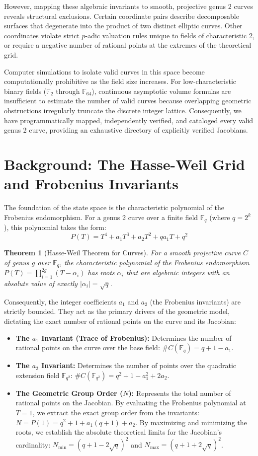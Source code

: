 \documentclass[letterpaper, 11pt]{article}
\newtheorem{theorem}{Theorem}[section]
\begin{document}
However, mapping these algebraic invariants to smooth, projective genus 2 curves reveals structural exclusions. Certain coordinate pairs describe decomposable surfaces that degenerate into the product of two distinct elliptic curves. Other coordinates violate strict $p$-adic valuation rules unique to fields of characteristic 2, or require a negative number of rational points at the extremes of the theoretical grid.

Computer simulations to isolate valid curves in this space become computationally prohibitive as the field size increases. For low-characteristic binary fields ($\mathbb{F}_2$ through $\mathbb{F}_{64}$), continuous asymptotic volume formulas are insufficient to estimate the number of valid curves because overlapping geometric obstructions irregularly truncate the discrete integer lattice. Consequently, we have programmatically mapped, independently verified, and cataloged every valid genus 2 curve, providing an exhaustive directory of explicitly verified Jacobians.

\section{Background: The Hasse-Weil Grid and Frobenius Invariants}
The foundation of the state space is the characteristic polynomial of the Frobenius endomorphism. For a genus 2 curve over a finite field $\mathbb{F}_q$ (where $q = 2^k$), this polynomial takes the form:
\[ P(T) = T^4 + a_1 T^3 + a_2 T^2 + q a_1 T + q^2 \]

\begin{theorem}[Hasse-Weil Theorem for Curves]
For a smooth projective curve $C$ of genus $g$ over $\mathbb{F}_q$, the characteristic polynomial of the Frobenius endomorphism $P(T) = \prod_{i=1}^{2g} (T - \alpha_i)$ has roots $\alpha_i$ that are algebraic integers with an absolute value of exactly $|\alpha_i| = \sqrt{q}$.
\end{theorem}

Consequently, the integer coefficients $a_1$ and $a_2$ (the Frobenius invariants) are strictly bounded. They act as the primary drivers of the geometric model, dictating the exact number of rational points on the curve and its Jacobian:
\begin{itemize}
    \item \textbf{The $a_1$ Invariant (Trace of Frobenius):} Determines the number of rational points on the curve over the base field: $\#C(\mathbb{F}_q) = q + 1 - a_1$.
    \item \textbf{The $a_2$ Invariant:} Determines the number of points over the quadratic extension field $\mathbb{F}_{q^2}$: $\#C(\mathbb{F}_{q^2}) = q^2 + 1 - a_1^2 + 2a_2$.
    \item \textbf{The Geometric Group Order ($N$):} Represents the total number of rational points on the Jacobian. By evaluating the Frobenius polynomial at $T=1$, we extract the exact group order from the invariants: $N = P(1) = q^2 + 1 + a_1(q + 1) + a_2$. By maximizing and minimizing the roots, we establish the absolute theoretical limits for the Jacobian's cardinality: $N_{\text{min}} = (q + 1 - 2\sqrt{q})^2$ and $N_{\text{max}} = (q + 1 + 2\sqrt{q})^2$.
\end{itemize}
\end{document}
